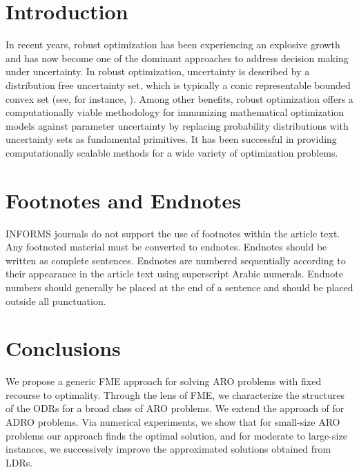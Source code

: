 \documentclass[mnsc,dblanonrev]{informs3test}
\begin{document}


\KEYWORDS{}
	
\maketitle
	
\section{Introduction}
\noindent In recent years, robust optimization has been experiencing an explosive growth and has now become one of the dominant approaches to address decision making under uncertainty. In robust optimization, uncertainty is described by a distribution free uncertainty set, which is typically a conic representable bounded convex set (see, for instance, \cite{gl97,gol98,bn98,bn99,bn00,bs04,bb09,bbc11}). Among other benefits, robust optimization offers a computationally viable methodology for immunizing mathematical optimization models against parameter uncertainty by\vadjust{\pagebreak} replacing probability distributions with uncertainty sets as fundamental primitives. It has been successful in providing computationally scalable methods for a wide variety of optimization problems. 

\section{Footnotes and Endnotes}\label{footsection1}
INFORMS journals do not support the use of footnotes within the article text. Any footnoted material must be converted to endnotes. Endnotes should be written as complete sentences. Endnotes are numbered sequentially according to their appearance in the article text using superscript Arabic numerals. Endnote numbers should generally be placed at the end of a sentence and should be placed outside all punctuation.



		
		\section{Conclusions} \label{sec:con}
		We propose a generic FME approach for solving ARO problems with fixed recourse to optimality. Through the lens of FME, we characterize the structures of the ODRs for a broad class of ARO problems. We extend the approach of \cite{bsz17} for ADRO problems. Via numerical experiments, we show that for small-size ARO problems our approach finds the optimal solution, and for moderate to large-size instances, we successively improve the approximated solutions obtained from LDRs. 
				
\end{document}
